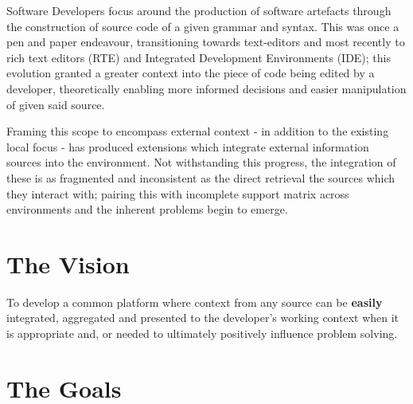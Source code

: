 Software Developers focus around the production of software artefacts through the construction of source code of a given grammar and syntax. This was once a pen and paper endeavour, transitioning towards text-editors and most recently to rich text editors (RTE) and Integrated Development Environments (IDE); this evolution granted a greater context into the piece of code being edited by a developer, theoretically enabling more informed decisions and easier manipulation of given said source.

Framing this scope to encompass external context - in addition to the existing local focus - has produced extensions which integrate external information sources into the environment. Not withstanding this progress, the integration of these is as fragmented and inconsistent as the direct retrieval the sources which they interact with; pairing this with incomplete support matrix across environments and the inherent problems begin to emerge.


\section{The Vision}

To develop a common platform where context from any source can be \textbf{easily} integrated, aggregated and presented to the developer's working context when it is appropriate and, or needed to ultimately positively influence problem solving. 

\section{The Goals}

